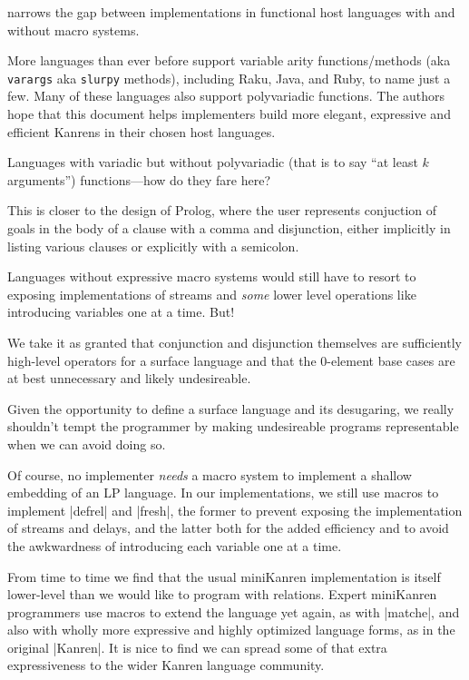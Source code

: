 \documentclass[sigplan,screen,draft,anonymous,review,natbib=false]{acmart}
\begin{document}
narrows the gap between implementations in functional host languages
with and without macro systems.

More languages than ever before support variable arity
functions/methods (aka \verb|varargs| aka \verb|slurpy| methods),
including Raku, Java, and Ruby, to name just a few. Many of these
languages also support polyvariadic functions. The authors hope that
this document helps implementers build more elegant, expressive and
efficient Kanrens in their chosen host languages.

Languages with variadic but without polyvariadic (that is to say
\enquote{at least $k$ arguments}) functions---how do they fare here?

This is closer to the design of Prolog,
where the user represents conjuction of goals in the body of a clause
with a comma and disjunction, either implicitly in listing various
clauses or explicitly with a semicolon.

Languages without expressive macro systems would still have to resort
to exposing implementations of streams and \emph{some} lower level
operations like introducing variables one at a time. But!

We take it as granted that conjunction and disjunction themselves are
sufficiently high-level operators for a surface language and that the
0-element base cases are at best unnecessary and likely undesireable.

Given the opportunity to define a surface language and its desugaring,
we really shouldn't tempt the programmer by making undesireable
programs representable when we can avoid doing so.

Of course, no implementer \emph{needs} a macro system to implement a
shallow embedding of an LP language. In our implementations, we still
use macros to implement \rackinline|defrel| and \rackinline|fresh|,
the former to prevent exposing the implementation of streams and
delays, and the latter both for the added efficiency and to avoid the
awkwardness of introducing each variable one at a time.

From time to time we find that the usual miniKanren implementation is
itself lower-level than we would like to program with relations.
Expert miniKanren programmers use macros to extend the language yet
again, as with \rackinline|matche|, and also with wholly more
expressive and highly optimized language forms, as in the original
\rackinline|Kanren|. It is nice to find we can spread some of that
extra expressiveness to the wider Kanren language community.
\end{document}
